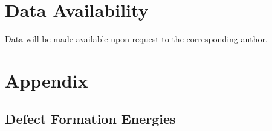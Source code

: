 \documentclass[review]{elsarticle}
\begin{document}
\section{Data Availability}\label{sec7}
Data will be made available upon request to the corresponding author. 

\section{Appendix}
\setcounter{figure}{0}
\setcounter{table}{0}
\renewcommand{\thefigure}{A\arabic{figure}}
\renewcommand{\thetable}{A\arabic{table}}

\subsection{Defect Formation Energies}
\end{document}
